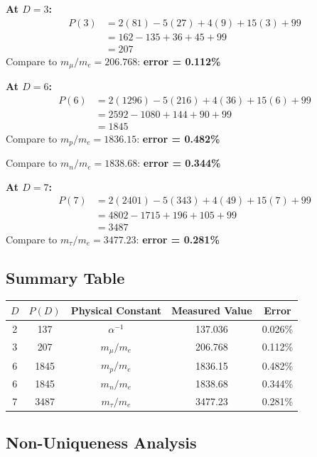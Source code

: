 \documentclass[11pt,a4paper]{article}
\begin{document}
\textbf{At $D = 3$:}
\begin{align}
P(3) &= 2(81) - 5(27) + 4(9) + 15(3) + 99 \nonumber \\
     &= 162 - 135 + 36 + 45 + 99 \nonumber \\
     &= 207
\end{align}
Compare to $m_\mu/m_e = 206.768$: \textbf{error = 0.112\%}

\textbf{At $D = 6$:}
\begin{align}
P(6) &= 2(1296) - 5(216) + 4(36) + 15(6) + 99 \nonumber \\
     &= 2592 - 1080 + 144 + 90 + 99 \nonumber \\
     &= 1845
\end{align}
Compare to $m_p/m_e = 1836.15$: \textbf{error = 0.482\%}

Compare to $m_n/m_e = 1838.68$: \textbf{error = 0.344\%}

\textbf{At $D = 7$:}
\begin{align}
P(7) &= 2(2401) - 5(343) + 4(49) + 15(7) + 99 \nonumber \\
     &= 4802 - 1715 + 196 + 105 + 99 \nonumber \\
     &= 3487
\end{align}
Compare to $m_\tau/m_e = 3477.23$: \textbf{error = 0.281\%}

\subsection{Summary Table}

\begin{center}
\begin{tabular}{ccccc}
\hline
$D$ & $P(D)$ & Physical Constant & Measured Value & Error \\
\hline
2 & 137 & $\alpha^{-1}$ & 137.036 & 0.026\% \\
3 & 207 & $m_\mu/m_e$ & 206.768 & 0.112\% \\
6 & 1845 & $m_p/m_e$ & 1836.15 & 0.482\% \\
6 & 1845 & $m_n/m_e$ & 1838.68 & 0.344\% \\
7 & 3487 & $m_\tau/m_e$ & 3477.23 & 0.281\% \\
\hline
\end{tabular}
\end{center}

\subsection{Non-Uniqueness Analysis}
\end{document}

